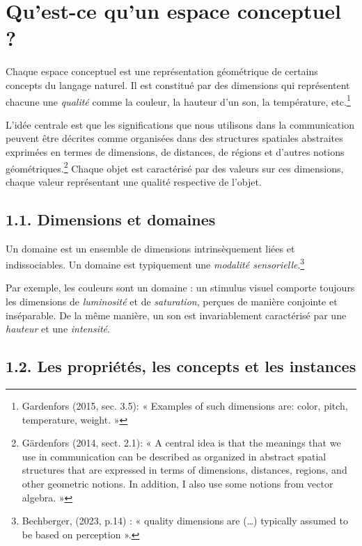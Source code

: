\documentclass{article}
\begin{document}
\section*{Qu’est-ce qu’un espace conceptuel ?}

Chaque espace conceptuel est une représentation géométrique de certains concepts du langage naturel. Il est constitué par des dimensions qui représentent chacune une \textit{qualité} comme la couleur, la hauteur d’un son, la température, etc.\footnote{Gardenfors (2015, sec. 3.5): « Examples of such dimensions are: color, pitch, temperature, weight. »}

L’idée centrale est que les significations que nous utilisons dans la communication peuvent être décrites comme organisées dans des structures spatiales abstraites exprimées en termes de dimensions, de distances, de régions et d’autres notions géométriques.\footnote{Gärdenfors (2014, sect. 2.1): « A central idea is that the meanings that we use in communication can be described as organized in abstract spatial structures that are expressed in terms of dimensions, distances, regions, and other geometric notions. In addition, I also use some notions from vector algebra. »}
Chaque objet est caractérisé par des valeurs sur ces dimensions, chaque valeur représentant une qualité respective de l'objet.

\subsection*{1.1. Dimensions et domaines}

Un domaine est un ensemble de dimensions intrinsèquement liées et indissociables. Un domaine est typiquement une \textit{modalité sensorielle}.\footnote{Bechberger, (2023, p.14) : «  quality dimensions are (…) typically assumed to be based on perception ».} 

Par exemple, les couleurs sont un domaine : un stimulus visuel comporte toujours les dimensions de \textit{luminosité} et de \textit{saturation}, perçues de manière conjointe et inséparable. De la même manière, un son est invariablement caractérisé par une \textit{hauteur} et une \textit{intensité}.

\subsection*{1.2. Les propriétés, les concepts et les instances}
\end{document}
